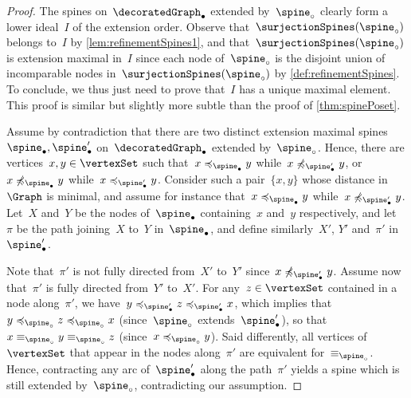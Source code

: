 \documentclass{amsart}
\theoremstyle{definition}
\begin{document}
\begin{proof}
  The spines on~$\decoratedGraph_\bullet$ extended by~$\spine_\circ$ clearly form a lower ideal~$I$ of the extension order.
  Observe that~$\surjectionSpines(\spine_\circ)$ belongs to~$I$ by \cref{lem:refinementSpines1}, and that~$\surjectionSpines(\spine_\circ)$ is extension maximal in~$I$ since each node of~$\spine_\circ$ is the disjoint union of incomparable nodes in~$\surjectionSpines(\spine_\circ)$ by \cref{def:refinementSpines}.
  To conclude, we thus just need to prove that~$I$ has a unique maximal element.
  This proof is similar but slightly more subtle than the proof of \cref{thm:spinePoset}.
  
  Assume by contradiction that there are two distinct extension maximal spines~$\spine_\bullet, \spine_\bullet'$ on~$\decoratedGraph_\bullet$ extended by~$\spine_\circ$.
  Hence, there are vertices~$x,y \in \vertexSet$ such that~$x \preccurlyeq_{\spine_\bullet} y$ while~$x \not\preccurlyeq_{\spine_\bullet'} y$, or~$x \not\preccurlyeq_{\spine_\bullet} y$ while~$x \preccurlyeq_{\spine_\bullet'} y$.
  Consider such a pair~$\{x,y\}$ whose distance in~$\Graph$ is minimal, and assume for instance that~$x \preccurlyeq_{\spine_\bullet} y$ while~$x \not\preccurlyeq_{\spine_\bullet'} y$.
  Let~$X$ and~$Y$ be the nodes of~$\spine_\bullet$ containing~$x$ and~$y$ respectively, and let~$\pi$ be the path joining~$X$ to~$Y$ in~$\spine_\bullet$, and define similarly~$X'$, $Y'$ and~$\pi'$ in~$\spine_\bullet'$.

  Note that~$\pi'$ is not fully directed from~$X'$ to~$Y'$ since~$x \not\preccurlyeq_{\spine_\bullet'} y$.
  Assume now that~$\pi'$ is fully directed from~$Y'$ to~$X'$.
  For any~$z \in \vertexSet$ contained in a node along~$\pi'$, we have~$y \preccurlyeq_{\spine_\bullet'} z \preccurlyeq_{\spine_\bullet'} x$, which implies that~$y \preccurlyeq_{\spine_\circ} z \preccurlyeq_{\spine_\circ} x$ (since~$\spine_\circ$ extends~$\spine_\bullet'$), so that~$x \equiv_{\spine_\circ} y \equiv_{\spine_\circ} z$ (since~$x \preccurlyeq_{\spine_\circ} y$).
  Said differently, all vertices of~$\vertexSet$ that appear in the nodes along~$\pi'$ are equivalent for~$\equiv_{\spine_\circ}$.
  Hence, contracting any arc of~$\spine_\bullet'$ along the path~$\pi'$ yields a spine which is still extended by~$\spine_\circ$, contradicting our assumption.


\end{proof}
\end{document}
